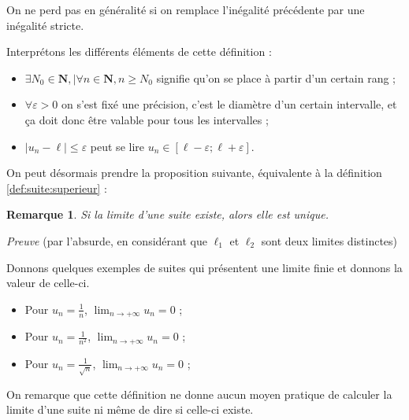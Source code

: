 \documentclass[12pt,a4paper]{article}
\newcommand{\N}{\mathbf{N}}
\newcommand{\vabs}[1]{\left\lvert #1 \right\rvert}
\theoremstyle{break}
\theoremstyle{plain}
\theoremstyle{nonumberplain}
\newtheorem{remarque}{Remarque}
\theoremstyle{nonumberbreak}
\begin{document}
On ne perd pas en généralité si on remplace l'inégalité précédente par
une inégalité stricte.

Interprétons les différents éléments de cette définition :
\begin{itemize}
  \item $\exists N_0\in\N, | \forall n \in\N , n\geq N_0$ signifie qu'on se
    place à partir d'un certain rang ;
  \item $\forall \varepsilon > 0$ on s'est fixé une précision, c'est le
    diamètre d'un certain intervalle, et ça doit donc être valable pour tous
    les intervalles ;
  \item $\vabs{u_n - \ell} \leq \varepsilon$ peut se lire $u_n \in [ \ell -
    \varepsilon ; \ell + \varepsilon ]$.
\end{itemize}

On peut désormais prendre la proposition suivante, équivalente à la
définition \ref{def:suite:superieur} :


\begin{remarque}
  Si la limite d'une suite existe, alors elle est unique.
\end{remarque}

\begin{minipage}{0.99\linewidth}
  \emph{Preuve} (par l'absurde, en considérant que $\ell_1$ et $\ell_2$ sont
  deux limites distinctes)
  \vspace{3cm}
\end{minipage}

Donnons quelques exemples de suites qui présentent une limite finie et
donnons la valeur de celle-ci.

\begin{itemize}
  \item Pour $u_n = \frac1n$, $\lim_{n\to +\infty}u_n = 0$ ;
  \item Pour $u_n = \frac1{n^2}$, $\lim_{n\to +\infty}u_n = 0$ ;
  \item Pour $u_n = \frac1{\sqrt{n}}$, $\lim_{n\to +\infty}u_n = 0$ ;
\end{itemize}

On remarque que cette définition ne donne aucun moyen pratique de
calculer la limite d'une suite ni même de dire si celle-ci existe.
\end{document}
